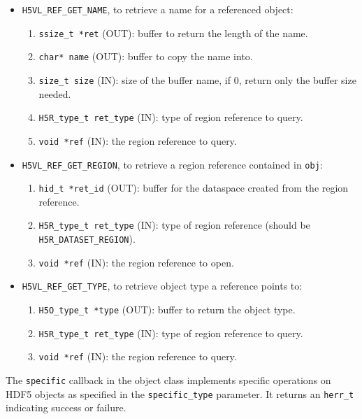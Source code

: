 \begin{itemize}
\item \texttt{H5VL\_REF\_GET\_NAME}, to retrieve a name for a referenced object:
  \begin{enumerate}
  \item \texttt{ssize\_t *ret} (OUT): buffer to return the length of the
    name.
  \item \texttt{char* name} (OUT): buffer to copy the name into.
  \item \texttt{size\_t size} (IN): size of the buffer name, if 0, return
    only the buffer size needed.
  \item \texttt{H5R\_type\_t ret\_type} (IN): type of region reference to
    query.
  \item \texttt{void *ref} (IN): the region reference to query.
  \end{enumerate}
  
\item \texttt{H5VL\_REF\_GET\_REGION}, to retrieve a region reference
  contained in \texttt{obj}:
  \begin{enumerate}
  \item \texttt{hid\_t *ret\_id} (OUT): buffer for the dataspace created
    from the region reference.
  \item \texttt{H5R\_type\_t ret\_type} (IN): type of region reference
    (should be \texttt{H5R\_DATASET\_REGION}).
  \item \texttt{void *ref} (IN): the region reference to open.
  \end{enumerate}

\item \texttt{H5VL\_REF\_GET\_TYPE}, to retrieve object type a reference
  points to:
  \begin{enumerate}
  \item \texttt{H5O\_type\_t *type} (OUT): buffer to return the object type.
  \item \texttt{H5R\_type\_t ret\_type} (IN): type of region reference to
    query.
  \item \texttt{void *ref} (IN): the region reference to query.
  \end{enumerate}
\end{itemize}

The \texttt{specific} callback in the object class implements specific operations on HDF5 objects as specified in the \texttt{specific\_type} parameter. It returns an \texttt{herr\_t} indicating success or failure.\bigskip

